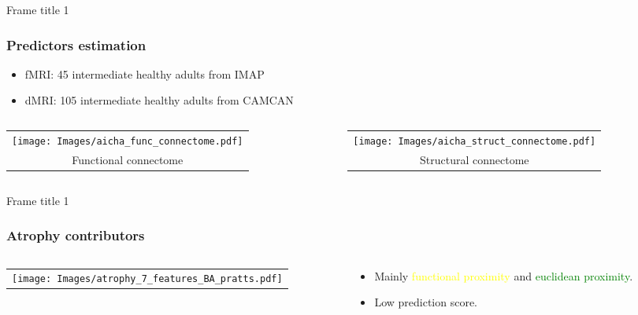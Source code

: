 \documentclass{beamer}
\begin{document}
\begin{frame}{Frame title 1}
\frametitle{Predictors estimation}
 \begin{itemize}
 \item fMRI: 45 intermediate healthy adults from IMAP
 \vspace*{0.02\linewidth}
 \item dMRI: 105 intermediate healthy adults from CAMCAN %
 \vspace*{0.02\linewidth}
 \end{itemize}
  \begin{center} 
    \begin{columns}

      \begin{column}{0.45\textwidth}
        \begin{tabular}{c} 
	   \texttt{[image: Images/aicha\_func\_connectome.pdf]}\\
		{Functional connectome}
        \end{tabular}   
      \end{column}

      \begin{column}{0.45\textwidth}
        \begin{tabular}{c} 
		\texttt{[image: Images/aicha\_struct\_connectome.pdf]}\\
		{Structural connectome}
		\end{tabular}   
      \end{column}

     \end{columns}
   \end{center}
\end{frame}
\begin{frame}{Frame title 1}
\frametitle{Atrophy contributors}
  \begin{center} 
    \begin{columns}

      \begin{column}{0.7\textwidth}
        \begin{tabular}{l} 
	   \texttt{[image: Images/atrophy\_7\_features\_BA\_pratts.pdf]}\\
        \end{tabular}   
      \end{column}

      \begin{column}{0.3\textwidth}
		\begin{itemize}
		\item Mainly {\textcolor{yellow}{functional proximity}} and {\textcolor{green}{euclidean proximity}}.
		\item Low prediction score.		
		\end{itemize}
      \end{column}

     \end{columns}
   \end{center}
\end{frame}
\end{document}
